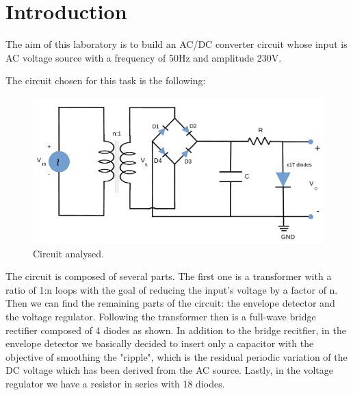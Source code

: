 \section{Introduction}
\label{sec:introduction}
The aim of this laboratory is to build an AC/DC converter
circuit whose input is AC voltage source with a frequency of 50Hz
and amplitude 230V.

The circuit chosen for this task is the following:

\begin{figure}[h] \centering
    \includegraphics[scale=0.45]{lab3.pdf}
    \caption{Circuit analysed.}
    \label{fig:rc}
\end{figure}

The circuit is composed of several parts. The first one is a
transformer with a ratio of 1:n loops with the goal
of reducing the input's voltage by a factor of n.
Then we can find the remaining parts of the circuit: the envelope detector
and the voltage regulator.
Following the transformer then is a full-wave bridge rectifier
composed of 4 diodes as shown.
In addition to the bridge recitfier, in the envelope detector we basically decided to insert only a
capacitor with the objective of smoothing the "ripple", which is the residual
periodic variation of the DC voltage which has been derived from the AC source.
Lastly, in the voltage regulator we have a resistor in series with 18 diodes.


